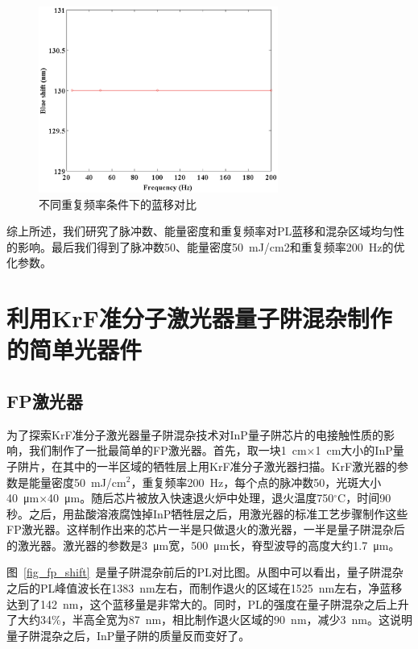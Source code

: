 \documentclass{ZJUthesis}
\begin{document}
\begin{figure}[htbp]
    \centering
    \includegraphics[width=0.7\textwidth]{./Pictures/qwi_rr.eps}
    \caption{不同重复频率条件下的蓝移对比}
    \label{fig_qwi_rr}
\end{figure}

综上所述，我们研究了脉冲数、能量密度和重复频率对PL蓝移和混杂区域均匀性的影响。最后我们得到了脉冲数50、能量密度50~mJ/cm2和重复频率200~Hz的优化参数。

\section{利用KrF准分子激光器量子阱混杂制作的简单光器件}

\subsection{FP激光器}

为了探索KrF准分子激光器量子阱混杂技术对InP量子阱芯片的电接触性质的影响，我们制作了一批最简单的FP激光器。首先，取一块1~cm$\times$1~cm大小的InP量子阱片，在其中的一半区域的牺牲层上用KrF准分子激光器扫描。KrF激光器的参数是能量密度50~mJ/cm$^2$，重复频率200~Hz，每个点的脉冲数50，光斑大小40~μm$\times$40~μm。随后芯片被放入快速退火炉中处理，退火温度750$^{\circ}$C，时间90秒。之后，用盐酸溶液腐蚀掉InP牺牲层之后，用激光器的标准工艺步骤制作这些FP激光器。这样制作出来的芯片一半是只做退火的激光器，一半是量子阱混杂后的激光器。激光器的参数是3~μm宽，500~μm长，脊型波导的高度大约1.7~μm。

图~\ref{fig_fp_shift}~是量子阱混杂前后的PL对比图。从图中可以看出，量子阱混杂之后的PL峰值波长在1383~nm左右，而制作退火的区域在1525~nm左右，净蓝移达到了142~nm，这个蓝移量是非常大的。同时，PL的强度在量子阱混杂之后上升了大约34\%，半高全宽为87~nm，相比制作退火区域的90~nm，减少3~nm。这说明量子阱混杂之后，InP量子阱的质量反而变好了。
\end{document}
